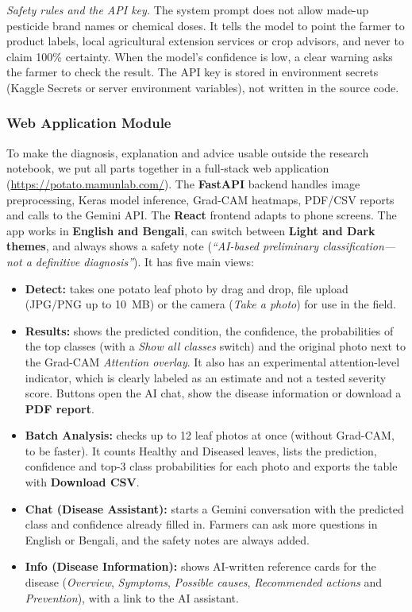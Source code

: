 \textit{Safety rules and the API key.} The system prompt does not allow made-up pesticide brand names or chemical doses. It tells the model to point the farmer to product labels, local agricultural extension services or crop advisors, and never to claim 100\% certainty. When the model's confidence is low, a clear warning asks the farmer to check the result. The API key is stored in environment secrets (Kaggle Secrets or server environment variables), not written in the source code.

\subsubsection{Web Application Module}
To make the diagnosis, explanation and advice usable outside the research notebook, we put all parts together in a full-stack web application (\url{https://potato.mamunlab.com/}). The \textbf{FastAPI} backend handles image preprocessing, Keras model inference, Grad-CAM heatmaps, PDF/CSV reports and calls to the Gemini API. The \textbf{React} frontend adapts to phone screens. The app works in \textbf{English and Bengali}, can switch between \textbf{Light and Dark themes}, and always shows a safety note (\textit{``AI-based preliminary classification---not a definitive diagnosis''}). It has five main views:
\begin{itemize}
    \item \textbf{Detect:} takes one potato leaf photo by drag and drop, file upload (JPG/PNG up to 10~MB) or the camera (\textit{Take a photo}) for use in the field.
    \item \textbf{Results:} shows the predicted condition, the confidence, the probabilities of the top classes (with a \textit{Show all classes} switch) and the original photo next to the Grad-CAM \textit{Attention overlay}. It also has an experimental attention-level indicator, which is clearly labeled as an estimate and not a tested severity score. Buttons open the AI chat, show the disease information or download a \textbf{PDF report}.
    \item \textbf{Batch Analysis:} checks up to 12 leaf photos at once (without Grad-CAM, to be faster). It counts Healthy and Diseased leaves, lists the prediction, confidence and top-3 class probabilities for each photo and exports the table with \textbf{Download CSV}.
    \item \textbf{Chat (Disease Assistant):} starts a Gemini conversation with the predicted class and confidence already filled in. Farmers can ask more questions in English or Bengali, and the safety notes are always added.
    \item \textbf{Info (Disease Information):} shows AI-written reference cards for the disease (\textit{Overview}, \textit{Symptoms}, \textit{Possible causes}, \textit{Recommended actions} and \textit{Prevention}), with a link to the AI assistant.
\end{itemize}

\clearpage
